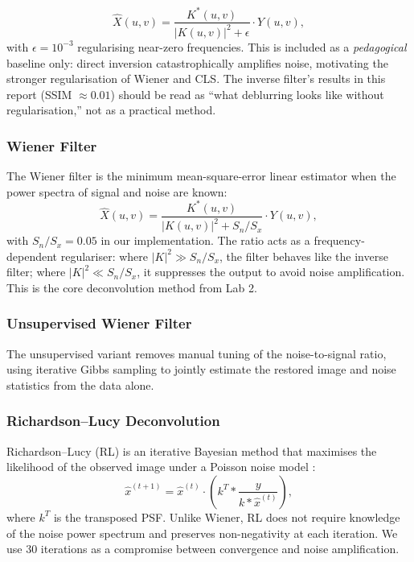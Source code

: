 \documentclass[12pt,a4paper]{article}
\begin{document}
\begin{equation}
  \hat{X}(u,v) = \frac{K^*(u,v)}{|K(u,v)|^2 + \epsilon} \cdot Y(u,v),
\end{equation}
with $\epsilon = 10^{-3}$ regularising near-zero frequencies. This is
included as a \textit{pedagogical} baseline only: direct inversion
catastrophically amplifies noise, motivating the stronger regularisation
of Wiener and CLS. The inverse filter's results in this report
(SSIM $\approx 0.01$) should be read as ``what deblurring looks like
without regularisation,'' not as a practical method.

\subsubsection{Wiener Filter}

The Wiener filter is the minimum mean-square-error linear estimator
when the power spectra of signal and noise are known:
\begin{equation}
  \hat{X}(u,v) = \frac{K^*(u,v)}{|K(u,v)|^2 + S_n/S_x} \cdot Y(u,v),
  \label{eq:wiener}
\end{equation}
with $S_n/S_x = 0.05$ in our implementation. The ratio acts as a
frequency-dependent regulariser: where $|K|^2 \gg S_n/S_x$, the filter
behaves like the inverse filter; where $|K|^2 \ll S_n/S_x$, it suppresses
the output to avoid noise amplification. This is the core deconvolution
method from Lab 2.

\subsubsection{Unsupervised Wiener Filter}

The unsupervised variant removes manual tuning of the noise-to-signal
ratio, using iterative Gibbs sampling to jointly estimate the restored
image and noise statistics from the data alone.

\subsubsection{Richardson--Lucy Deconvolution}

Richardson--Lucy (RL) is an iterative Bayesian method that maximises the
likelihood of the observed image under a Poisson noise model
\cite{richardson1972, lucy1974}:
\begin{equation}
  \hat{x}^{(t+1)} = \hat{x}^{(t)} \cdot \left( k^T \ast \frac{y}{k \ast \hat{x}^{(t)}} \right),
  \label{eq:rl}
\end{equation}
where $k^T$ is the transposed PSF. Unlike Wiener, RL does not require
knowledge of the noise power spectrum and preserves non-negativity at
each iteration. We use 30 iterations as a compromise between convergence
and noise amplification.
\end{document}
